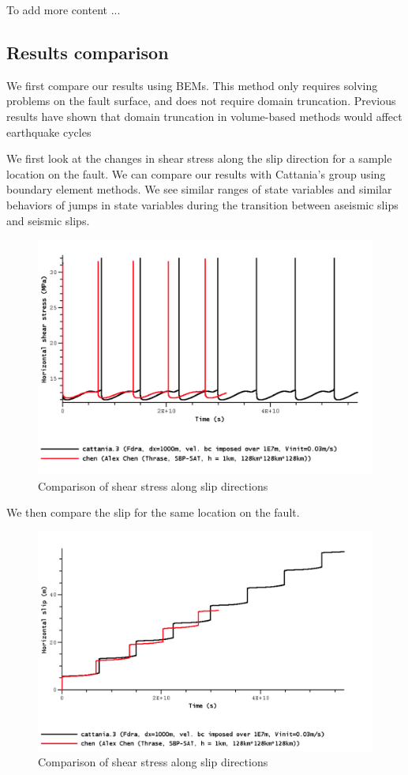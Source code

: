 To add more content ... 

\subsection{Results comparison}
We first compare our results using BEMs. This method only requires solving problems on the fault surface, and does not require domain truncation. Previous results have shown that domain truncation in volume-based methods would affect earthquake cycles

We first look at the changes in shear stress along the slip direction for a sample location on the fault. We can compare our results with Cattania's group using boundary element methods. We see similar ranges of state variables and similar behaviors of jumps in state variables during the transition between aseismic slips and seismic slips.

\begin{figure}
    \centering
    \includegraphics[width=\linewidth]{figures/sample-shearstress.png}
    \caption{Comparison of shear stress along slip directions}
    \label{fig:enter-label}
\end{figure}

We then compare the slip for the same location on the fault.

\begin{figure}
    \centering
    \includegraphics[width=\linewidth]{figures/sample-slip-2.png}
    \caption{Comparison of shear stress along slip directions}
    \label{fig:enter-label}
\end{figure}

